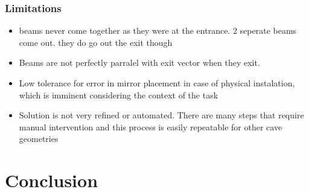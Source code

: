 \documentclass[11pt, letterpaper]{article}
\begin{document}
\subsubsection{Limitations}
\begin{itemize}
\item beams never come together as they were at the entrance. 2 seperate beams come out. they do go out the exit though

\item Beams are not perfectly parralel with exit vector when they exit. 

\item Low tolerance for error in mirror placement in case of physical instalation, which is imminent considering the context of the task

\item Solution is not very refined or automated. There are many steps that require manual intervention and this process is easily repeatable for other cave geometries

\end{itemize}
\section{Conclusion}


 \newpage
 
 
\end{document}
